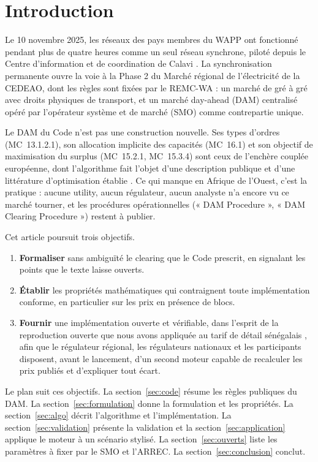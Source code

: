 \documentclass[a4paper,12pt]{article}
\theoremstyle{definition}
\newcommand{\MC}[1]{MC~#1}
\begin{document}
\section{Introduction}

Le 10 novembre 2025, les réseaux des pays membres du WAPP ont fonctionné pendant plus de quatre heures comme un seul réseau synchrone, piloté depuis le Centre d'information et de coordination de Calavi \citep{wapp2025sync}. La synchronisation permanente ouvre la voie à la Phase 2 du Marché régional de l'électricité de la CEDEAO, dont les règles sont fixées par le REMC-WA \citep{remcwa2025} : un marché de gré à gré avec droits physiques de transport, et un marché day-ahead (DAM) centralisé opéré par l'opérateur système et de marché (SMO) comme contrepartie unique.

Le DAM du Code n'est pas une construction nouvelle. Ses types d'ordres (\MC{13.1.2.1}), son allocation implicite des capacités (\MC{16.1}) et son objectif de maximisation du surplus (\MC{15.2.1}, \MC{15.3.4}) sont ceux de l'enchère couplée européenne, dont l'algorithme fait l'objet d'une description publique \citep{euphemia2025} et d'une littérature d'optimisation établie \citep{oneill2005,meeus2009,vanvyve2011,martin2014,madani2015}. Ce qui manque en Afrique de l'Ouest, c'est la pratique : aucune utility, aucun régulateur, aucun analyste n'a encore vu ce marché tourner, et les procédures opérationnelles (« DAM Procedure », « DAM Clearing Procedure ») restent à publier.

Cet article poursuit trois objectifs.

\begin{enumerate}
\item \textbf{Formaliser} sans ambiguïté le clearing que le Code prescrit, en signalant les points que le texte laisse ouverts.
\item \textbf{Établir} les propriétés mathématiques qui contraignent toute implémentation conforme, en particulier sur les prix en présence de blocs.
\item \textbf{Fournir} une implémentation ouverte et vérifiable, dans l'esprit de la reproduction ouverte que nous avons appliquée au tarif de détail sénégalais \citep{seck2026woyofal}, afin que le régulateur régional, les régulateurs nationaux et les participants disposent, avant le lancement, d'un second moteur capable de recalculer les prix publiés et d'expliquer tout écart.
\end{enumerate}

Le plan suit ces objectifs. La section~\ref{sec:code} résume les règles publiques du DAM. La section~\ref{sec:formulation} donne la formulation et les propriétés. La section~\ref{sec:algo} décrit l'algorithme et l'implémentation. La section~\ref{sec:validation} présente la validation et la section~\ref{sec:application} applique le moteur à un scénario stylisé. La section~\ref{sec:ouverts} liste les paramètres à fixer par le SMO et l'ARREC. La section~\ref{sec:conclusion} conclut.
\end{document}

